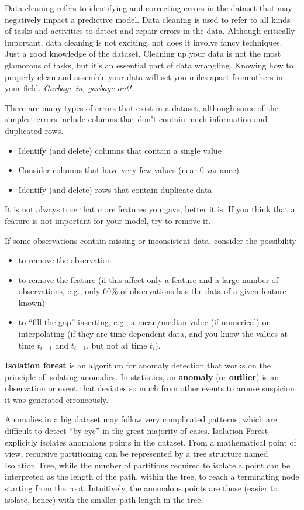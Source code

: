 Data cleaning refers to identifying and correcting errors in the dataset that may negatively impact a predictive model. Data cleaning is used to refer to all kinds of tasks and activities to detect and repair errors in the data. Although critically important, data cleaning is not exciting, not does it involve fancy techniques. Just a good knowledge of the dataset. Cleaning up your data is not the most glamorous of tasks, but it's an essential part of data wrangling. Knowing how to properly clean and assemble your data will set you miles apart from others in your field. \textit{Garbage in, garbage out!}

There are many types of errors that exist in a dataset, although some of the simplest errors include columns that don't contain much information and duplicated rows.
\begin{itemize}
    \item Identify (and delete) columns that contain a single value
    \item Consider columns that have very few values (near $0$ variance)
    \item Identify (and delete) rows that contain duplicate data
\end{itemize}

It is not always true that more features you gave, better it is. If you think that a feature is not important for your model, try to remove it.

If some observations contain missing or inconsistent data, consider the possibility
\begin{itemize}
    \item to remove the observation
    \item to remove the feature (if this affect only a feature and a large number of observations, e.g., only 60\% of observations has the data of a given feature known)
    \item to ``fill the gap'' inserting, e.g., a mean/median value (if numerical) or interpolating (if they are time-dependent data, and you know the values at time $t_{i-1}$ and $t_{i+1}$, but not at time $t_{i}$).
\end{itemize}

\textbf{Isolation forest} is an algorithm for anomaly detection that works on the principle of isolating anomalies. In statistics, an \textbf{anomaly} (or \textbf{outlier}) is an observation or event that deviates so much from other events to arouse suspicion it was generated erroneously.

Anomalies in a big dataset may follow very complicated patterns, which are difficult to detect ``by eye'' in the great majority of cases. Isolation Forest explicitly isolates anomalous points in the dataset. From a mathematical point of view, recursive partitioning can be represented by a tree structure named Isolation Tree, while the number of partitions required to isolate a point can be interpreted as the length of the path, within the tree, to reach a terminating node starting from the root. Intuitively, the anomalous points are those (easier to isolate, hence) with the smaller path length in the tree.

